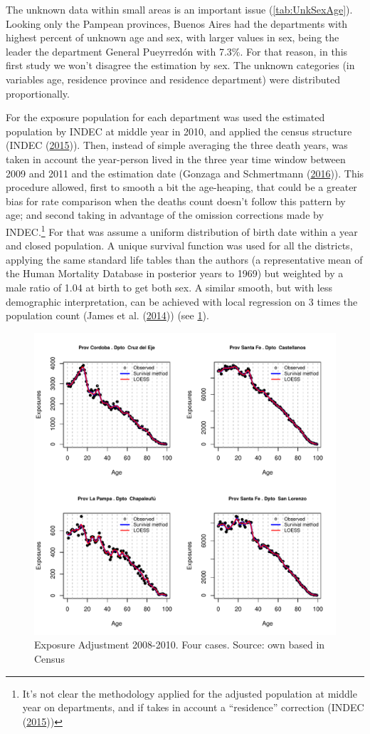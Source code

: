 \documentclass[12pt,]{article}
\begin{document}
The unknown data within small areas is an important issue
(\ref{tab:UnkSexAge}). Looking only the Pampean provinces, Buenos Aires
had the departments with highest percent of unknown age and sex, with
larger values in sex, being the leader the department General Pueyrredón
with 7.3\%. For that reason, in this first study we won't disagree the
estimation by sex. The unknown categories (in variables age, residence
province and residence department) were distributed proportionally.

For the exposure population for each department was used the estimated
population by INDEC at middle year in 2010, and applied the census
structure (INDEC (\protect\hyperlink{ref-INDEC2015}{2015})). Then,
instead of simple averaging the three death years, was taken in account
the year-person lived in the three year time window between 2009 and
2011 and the estimation date (Gonzaga and Schmertmann
(\protect\hyperlink{ref-Gonzaga_Schmertmann_2016}{2016})). This
procedure allowed, first to smooth a bit the age-heaping, that could be
a greater bias for rate comparison when the deaths count doesn't follow
this pattern by age; and second taking in advantage of the omission
corrections made by INDEC.\footnote{It's not clear the methodology
  applied for the adjusted population at middle year on departments, and
  if takes in account a ``residence'' correction (INDEC
  (\protect\hyperlink{ref-INDEC2015}{2015}))} For that was assume a
uniform distribution of birth date within a year and closed population.
A unique survival function was used for all the districts, applying the
same standard life tables than the authors (a representative mean of the
Human Mortality Database in posterior years to 1969) but weighted by a
male ratio of 1.04 at birth to get both sex. A similar smooth, but with
less demographic interpretation, can be achieved with local regression
on 3 times the population count (James et al.
(\protect\hyperlink{ref-James2014}{2014})) (see \ref{fig:AdjExp}).

\begin{figure}

{\centering \includegraphics[width=0.7\linewidth]{analysis/plots/AdjExp} 

}

\caption{Exposure Adjustment 2008-2010. Four cases. Source: own based in Census}\label{fig:AdjExp}
\end{figure}
\end{document}
